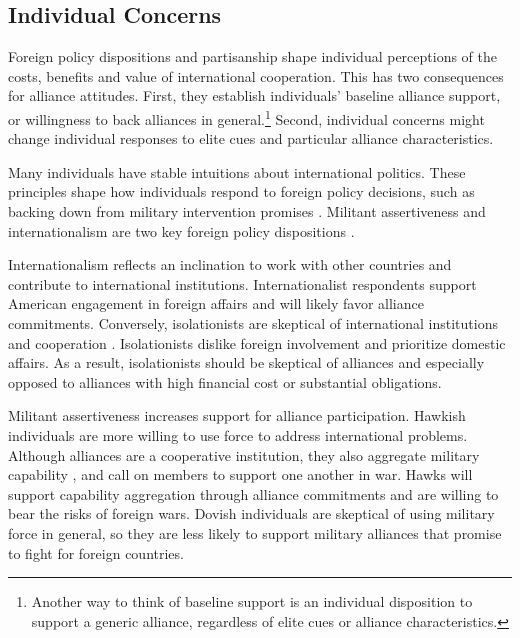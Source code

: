 \documentclass[12pt]{article}
\begin{document}
\subsection{Individual Concerns}


Foreign policy dispositions and partisanship shape individual perceptions of the costs, benefits and value of international cooperation. 
This has two consequences for alliance attitudes. 
First, they establish individuals' baseline alliance support, or willingness to back alliances in general.\footnote{Another way to think of baseline support is an individual disposition to support a generic alliance, regardless of elite cues or alliance characteristics.} 
Second, individual concerns might change individual responses to elite cues and particular alliance characteristics. 


Many individuals have stable intuitions about international politics. 
These principles shape how individuals respond to foreign policy decisions, such as backing down from military intervention promises \citep{KertzerBrutger2016}. 
Militant assertiveness and internationalism are two key foreign policy dispositions \citep{Herrmannetal1999}.  


Internationalism reflects an inclination to work with other countries and contribute to international institutions. 
Internationalist respondents support American engagement in foreign affairs and will likely favor alliance commitments. 
Conversely, isolationists are skeptical of international institutions and cooperation \citep{Kertzer2013}. 
Isolationists dislike foreign involvement and prioritize domestic affairs. 
As a result, isolationists should be skeptical of alliances and especially opposed to alliances with high financial cost or substantial obligations. 


Militant assertiveness increases support for alliance participation. 
Hawkish individuals are more willing to use force to address international problems. 
Although alliances are a cooperative institution, they also aggregate military capability \citep{FordhamPoast2014}, and call on members to support one another in war.
Hawks will support capability aggregation through alliance commitments and are willing to bear the risks of foreign wars.  
Dovish individuals are skeptical of using military force in general, so they are less likely to support military alliances that promise to fight for foreign countries.  
\end{document}
